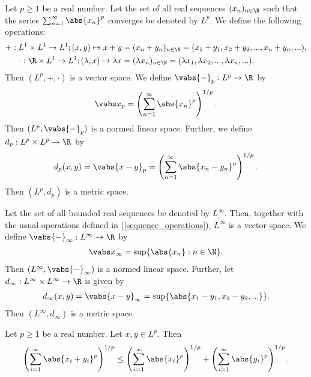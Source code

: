 \documentclass{article}
\begin{document}
\begin{lemma}
    Let $p\geq 1$ be a real number.
    Let the set of all real sequences $(x_n)_{n\in\N}$ such that the series 
    $\sum_{n=1}^\infty \abs{x_n}^p$ converges be denoted by $L^p$. 
    We define the following operations:
    \begin{align}
        \label{sequence_operations}
        +:L^1\times L^1\to L^1;(x,y)\mapsto x+y&=(x_n+y_n)_{n\in\N}=(x_1+y_1,x_2+y_2,...,x_n+y_n,...),\\
        \cdot:\R\times L^1\to L^1;(\lambda,x)\mapsto\lambda x&=(\lambda x_n)_{n\in\N}=(\lambda x_1,\lambda x_2,...,\lambda x_n,...).
    \end{align}
    Then $(L^p,+,\cdot)$ is a vector space.
    We define $\vabs{-}_p:L^p\to\R$ by 
    \begin{align*}
        \vabs x_p = \left(\sum_{n=1}^\infty \abs{x_n}^p\right)^{1/p}.
    \end{align*}
    Then $(L^p, \vabs{-}_p)$ is a normed linear space.
    Further, we define $d_p:L^p\times L^p\to\R$ by 
    \begin{align*}
        d_p(x,y)=\vabs{x-y}_p=\left(\sum_{n=1}^\infty\abs{x_n-y_n}^p\right)^{1/p}.
    \end{align*}
    Then $(L^p,d_p)$ is a metric space.
\end{lemma}

\begin{lemma}
    Let the set of all bounded real sequences be denoted by $L^\infty$. Then, together with 
    the usual operations defined in (\ref{sequence_operations}), $L^\infty$ is a vector space.
    We define $\vabs{-}_\infty:L^\infty\to\R$ by 
    \begin{align*}
        \vabs x_\infty = \sup\{\abs{x_n}:n\in\N\}.
    \end{align*}
    Then $(L^\infty,\vabs{-}_\infty)$ is a normed linear space.
    Further, let $d_\infty:L^\infty\times L^\infty\to\R$ is given by 
    \begin{align*}
        d_\infty(x,y)=\vabs{x-y}_\infty = \sup\{\abs{x_1-y_1,x_2-y_2,...}\}.
    \end{align*}
    Then $(L^\infty, d_\infty)$ is a metric space.
\end{lemma}

\begin{lemma}
    Let $p\geq 1$ be a real number. Let $x,y\in L^p$. Then 
    \begin{align*}
        \left(\sum_{i=1}^\infty \abs{x_i+y_i}^p\right)^{1/p}
        \leq \left(\sum_{i=1}^\infty \abs{x_i}^p\right)^{1/p}
        + \left(\sum_{i=1}^\infty \abs{y_i}^p\right)^{1/p}.
    \end{align*}
\end{lemma}
\end{document}
